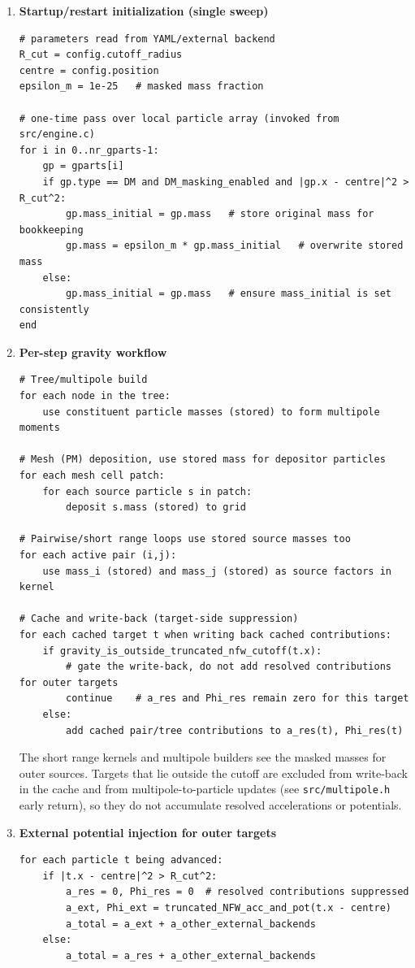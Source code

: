 \begin{enumerate}
\item \textbf{Startup/restart initialization (single sweep)}
\begin{lstlisting}[basicstyle=\footnotesize\ttfamily,breaklines=true]
# parameters read from YAML/external backend
R_cut = config.cutoff_radius
centre = config.position
epsilon_m = 1e-25	# masked mass fraction

# one-time pass over local particle array (invoked from src/engine.c)
for i in 0..nr_gparts-1:
	gp = gparts[i]
	if gp.type == DM and DM_masking_enabled and |gp.x - centre|^2 > R_cut^2:
		gp.mass_initial = gp.mass	# store original mass for bookkeeping
		gp.mass = epsilon_m * gp.mass_initial	# overwrite stored mass
	else:
		gp.mass_initial = gp.mass	# ensure mass_initial is set consistently
end
\end{lstlisting}

\item \textbf{Per-step gravity workflow}
\begin{lstlisting}[basicstyle=\footnotesize\ttfamily,breaklines=true]
# Tree/multipole build
for each node in the tree:
	use constituent particle masses (stored) to form multipole moments

# Mesh (PM) deposition, use stored mass for depositor particles
for each mesh cell patch:
	for each source particle s in patch:
		deposit s.mass (stored) to grid

# Pairwise/short range loops use stored source masses too
for each active pair (i,j):
	use mass_i (stored) and mass_j (stored) as source factors in kernel

# Cache and write-back (target-side suppression)
for each cached target t when writing back cached contributions:
	if gravity_is_outside_truncated_nfw_cutoff(t.x):
		# gate the write-back, do not add resolved contributions for outer targets
		continue	# a_res and Phi_res remain zero for this target
	else:
		add cached pair/tree contributions to a_res(t), Phi_res(t)
\end{lstlisting}

The short range kernels and multipole builders see the masked masses for outer sources. Targets that lie outside the cutoff are excluded from write-back in the cache and from multipole-to-particle updates (see \texttt{src/multipole.h} early return), so they do not accumulate resolved accelerations or potentials.

\item \textbf{External potential injection for outer targets}
\begin{lstlisting}[basicstyle=\footnotesize\ttfamily,breaklines=true]
for each particle t being advanced:
	if |t.x - centre|^2 > R_cut^2:
		a_res = 0, Phi_res = 0  # resolved contributions suppressed
		a_ext, Phi_ext = truncated_NFW_acc_and_pot(t.x - centre)
		a_total = a_ext + a_other_external_backends
	else:
		a_total = a_res + a_other_external_backends
\end{lstlisting}


\end{enumerate}
